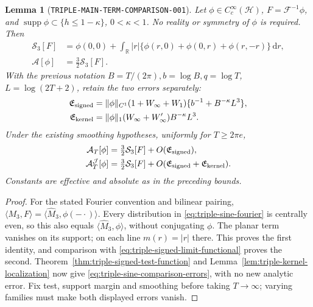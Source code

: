 \documentclass[11pt]{article}
\newtheorem{lemma}{Lemma}
\newcommand{\dd}{\,\mathrm d}
\begin{document}
\begin{lemma}[\texttt{TRIPLE-MAIN-TERM-COMPARISON-001}]
\label{lem:triple-main-term-comparison}
Let \(\phi\in C_c^\infty(\mathcal H)\), \(F=\mathcal F^{-1}\phi\),
and \(\operatorname{supp}\phi\subset\{h\leq1-\kappa\}\),
\(0<\kappa<1\). No reality or symmetry of \(\phi\) is required. Then
\begin{equation}\label{eq:triple-main-term-comparison}
 \begin{split}
 \mathcal S_3[F]&=\phi(0,0)+\int_{\mathbb R}|r|
       \{\phi(r,0)+\phi(0,r)+\phi(r,-r)\}\dd r,\\
 \mathcal A[\phi]&=\tfrac32\mathcal S_3[F].
 \end{split}
\end{equation}
With the previous notation \(B=T/(2\pi), b=\log B, q=\log T\),
\(L=\log(2T+2)\), retain the two errors separately:
\begin{align*}
 \mathfrak E_{\rm signed}&=\|\phi\|_{C^1}(1+W_\infty+W_1)
                    \{b^{-1}+B^{-\kappa}L^3\},\\
 \mathfrak E_{\rm kernel}&=\|\phi\|_1(W_\infty+W'_\infty)
                         B^{-\kappa}L^3.
\end{align*}
Under the existing smoothing hypotheses, uniformly for \(T\geq2\pi e\),
\begin{align}
 \mathcal A_T[\phi]&=\tfrac32\mathcal S_3[F]
                         +O(\mathfrak E_{\rm signed}),\notag\\
 \mathcal A_T^{\mathcal J}[\phi]&=\tfrac32\mathcal S_3[F]
                 +O(\mathfrak E_{\rm signed}+\mathfrak E_{\rm kernel}).
 \label{eq:triple-sine-comparison-errors}
\end{align}
Constants are effective and absolute as in the preceding bounds.
\end{lemma}
\begin{proof}
For the stated Fourier convention and bilinear pairing,
\(\langle M_3,F\rangle=\langle\widehat M_3,\phi(-\cdot)\rangle\).
Every distribution in \eqref{eq:triple-sine-fourier} is centrally even,
so this also equals \(\langle\widehat M_3,\phi\rangle\), without conjugating
\(\phi\). The planar term vanishes on its support; on each line
\(m(r)=|r|\) there. This proves the first identity, and comparison with
\eqref{eq:triple-signed-limit-functional} proves the second.
Theorem~\ref{thm:triple-signed-test-function} and
Lemma~\ref{lem:triple-kernel-localization} now give
\eqref{eq:triple-sine-comparison-errors}, with no new analytic error.
Fix test, support margin and smoothing before taking \(T\to\infty\);
varying families must make both displayed errors vanish.
\end{proof}
\end{document}

